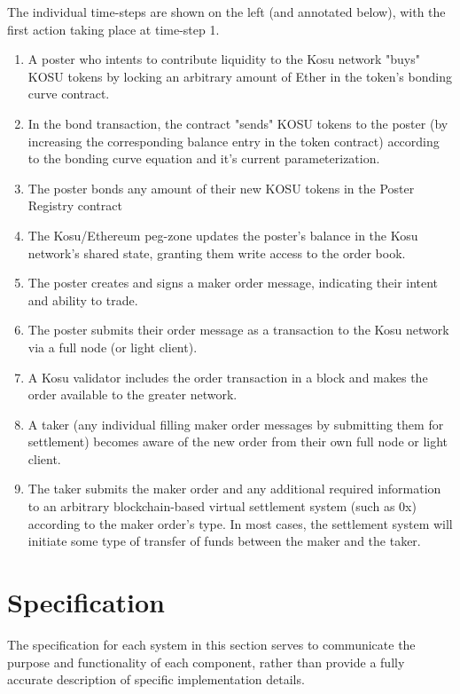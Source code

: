 \documentclass[10pt]{article}
\begin{document}
The individual time-steps are shown on the left (and annotated below), with the first action taking place at time-step 1.
\medskip

\begin{enumerate}[1.]
  \item A poster who intents to contribute liquidity to the Kosu network "buys" KOSU tokens by locking an arbitrary amount of Ether in the token's bonding curve contract.
  \item In the bond transaction, the contract "sends" KOSU tokens to the poster (by increasing the corresponding balance entry in the token contract) according to the bonding curve equation and it's current parameterization.
  \item The poster bonds any amount of their new KOSU tokens in the Poster Registry contract
  \item The Kosu/Ethereum peg-zone updates the poster's balance in the Kosu network's shared state, granting them write access to the order book.
  \item The poster creates and signs a maker order message, indicating their intent and ability to trade.
  \item The poster submits their order message as a transaction to the Kosu network via a full node (or light client).
  \item A Kosu validator includes the order transaction in a block and makes the order available to the greater network.
  \item A taker (any individual filling maker order messages by submitting them for settlement) becomes aware of the new order from their own full node or light client.
  \item The taker submits the maker order and any additional required information to an arbitrary blockchain-based virtual settlement system (such as 0x) according to the maker order's type. In most cases, the settlement system will initiate some type of transfer of funds between the maker and the taker.
\end{enumerate}
\clearpage
\pagebreak


\section{Specification}\label{specification}
The specification for each system in this section serves to communicate the purpose and functionality of each component, rather than provide a fully accurate description of specific implementation details.
\medskip
\end{document}
